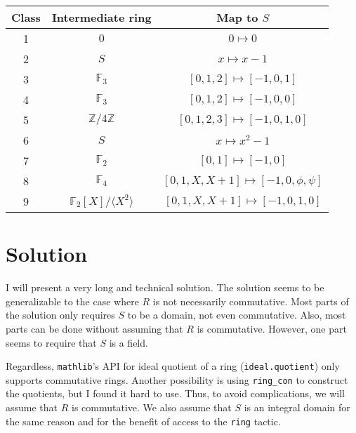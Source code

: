 \documentclass{article}
\newcommand{\F}{\mathbb{F}}
\newcommand{\Z}{\mathbb{Z}}
\begin{document}
\begin{table}[H]
\centering
\begin{tabular}{|c|c|c|}
    \hline
    Class & Intermediate ring & Map to $S$ \\ \hline
    1 & $0$ & $0 \mapsto 0$ \\ \hline
    2 & $S$ & $x \mapsto x - 1$ \\ \hline
    3 & $\F_3$ & $[0, 1, 2] \mapsto [-1, 0, 1]$ \\ \hline
    4 & $\F_3$ & $[0, 1, 2] \mapsto [-1, 0, 0]$ \\ \hline
    5 & $\Z/4\Z$ & $[0, 1, 2, 3] \mapsto [-1, 0, 1, 0]$ \\ \hline
    6 & $S$ & $x \mapsto x^2 - 1$ \\ \hline
    7 & $\F_2$ & $[0, 1] \mapsto [-1, 0]$ \\ \hline
    8 & $\F_4$ & $[0, 1, X, X + 1] \mapsto [-1, 0, \phi, \psi]$ \\ \hline
    9 & $\F_2[X]/\langle X^2 \rangle$ & $[0, 1, X, X + 1] \mapsto [-1, 0, 1, 0]$ \\ \hline
\end{tabular}
\end{table}









\section*{Solution}

I will present a very long and technical solution.
The solution seems to be generalizable to the case where $R$ is not necessarily commutative.
Most parts of the solution only requires $S$ to be a domain, not even commutative.
Also, most parts can be done without assuming that $R$ is commutative.
However, one part seems to require that $S$ is a field.

Regardless, \texttt{mathlib}'s API for ideal quotient of a ring (\texttt{ideal.quotient}) only supports commutative rings.
Another possibility is using \texttt{ring\_con} to construct the quotients, but I found it hard to use.
Thus, to avoid complications, we will assume that $R$ is commutative.
We also assume that $S$ is an integral domain for the same reason and for the benefit of access to the \texttt{ring} tactic.
\end{document}
